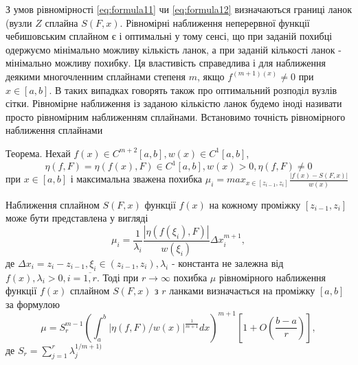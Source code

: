 \documentclass[ukrainian,14pt]{extarticle}
\begin{document}
З умов рівномірності \ref{eq:formula11} чи \ref{eq:formula12} визначаються границі ланок (вузли $Z$ сплайна $S(F, x)$. Рівномірні наближення неперервної функції чебишовським сплайном є і оптимальні у тому сенсі, що при заданій похибці одержуємо мінімально можливу кількість ланок, а при заданій кількості ланок - мінімально можливу похибку. Ця властивість справедлива і для наближення деякими многочленним сплайнами степеня $m$, якщо $f^{(m+1)(x)} \neq 0$ при $x \in [a, b]$. В таких випадках говорять також про оптимальний розподіл вузлів сітки.
Рівномірне наближення із заданою кількістю ланок будемо іноді називати просто рівномірним наближенням сплайнами. Встановимо точність рівномірного наближення сплайнами

Теорема. Нехай $f(x) \in C^{m+2}[a,b], w(x)\in C^{1}[a,b]$,
$$\eta(f, F) = \eta(f(x), F) \in C^1[a,b], w(x) > 0, \eta(f, F) \neq 0$$ при $x \in [a,b]$
і максимальна зважена похибка
$\mu_i = max_{x\in[z_{i-1}, z_i]} \frac{|f(x)-S(F,x)|}{w(x)}$

Наближення сплайном $S(F, x) $ функції $f(x)$ на кожному проміжку $[z_{i-1}, z_i]$ може бути представлена у вигляді
$$\mu_i = \frac{1}{\lambda_i} \frac{|\eta(f(\xi_i),F)|}{w(\xi_i)} \Delta x_i^{m+1},$$
де $\Delta x_i = z_i - z_{i-1}, \xi_i \in (z_{i-1}, z_i), \lambda_i$ - константа не залежна від $f(x), \lambda_i > 0, i = \overline{1, r}$.
Тоді при $r \rightarrow \infty$ похибка $\mu$ рівномірного наближення функції $f(x)$ сплайном $S(F, x)$ з $r$ ланками визначається на проміжку $[a, b]$ за формулою
$$\mu = S_r^{m-1}\left(\int_a^b |\eta(f, F)/ w(x)|^{\frac{1}{m+1}} dx \right)^{m+1}\left[ 1+O\left(\frac{b-a}{r}\right) \right], $$
де $S_r = \sum_{j=1}^{r} \lambda_j^{1/m+1)}$

%
%
%
\end{document}
